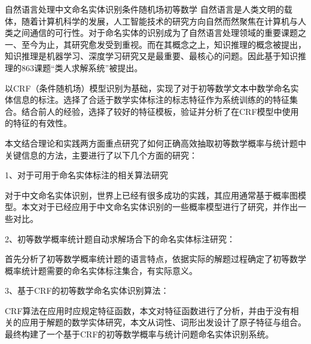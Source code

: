 
\begin{Cabstract}{自然语言处理}{中文命名实体识别}{条件随机场}{初等数学}{}
自然语言是人类文明的载体，随着计算机科学的发展，人工智能技术的研究方向自然而然聚焦在计算机与人类之间通信的可行性。对于命名实体的识别成为了自然语言处理领域的重要课题之一、至今为止，其研究愈发受到重视。而在其概念之上，知识推理的概念被提出，知识推理是机器学习、深度学习研究又是最重要、最核心的问题。因此基于知识推理的863课题“类人求解系统”被提出。

以CRF（条件随机场）模型识别为基础，实现了对于初等数学文本中数学命名实体信息的标注。选择了合适于数学实体标注的标志特征作为系统训练的的特征集合。结合前人的经验，选择了较好的特征模板，验证并分析了在CRF模型中使用的特征的有效性。

本文结合理论和实践两方面重点研究了如何正确高效抽取初等数学概率与统计题中关键信息的方法，主要进行了以下几个方面的研究：

1、对于可用于命名实体标注的相关算法研究

对于中文命名实体识别，世界上已经有很多成功的实践，其应用通常基于概率图模型。本文对于已经应用于中文命名实体识别的一些概率模型进行了研究，并作出一些对比。

2、初等数学概率统计题自动求解场合下的命名实体标注研究：

首先分析了初等数学概率统计题的语言特点，依据实际的解题过程确定了初等数学概率统计题需要的命名实体标注集合，有实际意义。

3、基于CRF的初等数学命名实体识别算法：

CRF算法在应用时应规定特征函数，本文对特征函数进行了分析，并由于没有相关的应用于解题的数学实体研究，本文从词性、词形出发设计了原子特征与组合。最终构建了一个基于CRF的初等数学概率与统计问题命名实体识别系统。
\end{Cabstract}
